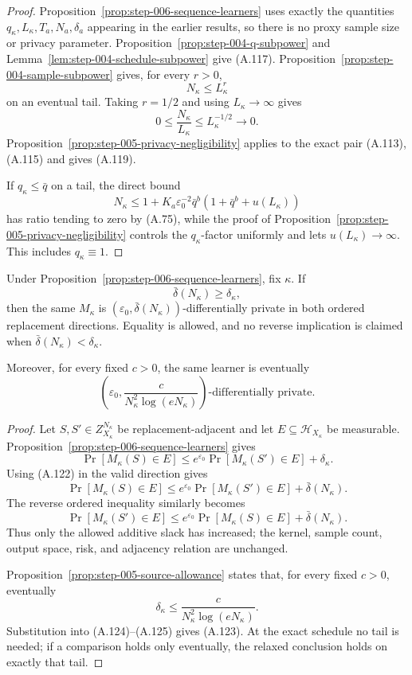 \begin{proof}
Proposition~\ref{prop:step-006-sequence-learners} uses exactly the
quantities \(q_\kappa,L_\kappa,T_a,N_a,\delta_a\) appearing in the
earlier results, so there is no proxy sample size or privacy
parameter.  Proposition~\ref{prop:step-004-q-subpower} and
Lemma~\ref{lem:step-004-schedule-subpower} give (A.117).
Proposition~\ref{prop:step-004-sample-subpower} gives, for every
\(r>0\),
\[
N_\kappa\leq L_\kappa^r
\tag{A.120}
\]
on an eventual tail.  Taking \(r=1/2\) and using
\(L_\kappa\to\infty\) gives
\[
0\leq\frac{N_\kappa}{L_\kappa}
\leq L_\kappa^{-1/2}
\longrightarrow0.
\tag{A.121}
\]
Proposition~\ref{prop:step-005-privacy-negligibility} applies to the
exact pair (A.113), (A.115) and gives (A.119).

If \(q_\kappa\leq\bar q\) on a tail, the direct bound
\[
N_\kappa
\leq
1+K_a\varepsilon_0^{-2}\bar q^b
(1+\bar q^b+u(L_\kappa))
\]
has ratio tending to zero by (A.75), while the proof of
Proposition~\ref{prop:step-005-privacy-negligibility} controls the
\(q_\kappa\)-factor uniformly and lets \(u(L_\kappa)\to\infty\).
This includes \(q_\kappa\equiv1\).
\end{proof}

\begin{lemma}
\label{lem:step-006-privacy-relaxation}
Under Proposition~\ref{prop:step-006-sequence-learners}, fix
\(\kappa\).  If
\[
\bar\delta(N_\kappa)\geq\delta_\kappa,
\tag{A.122}
\]
then the same \(M_\kappa\) is
\((\varepsilon_0,\bar\delta(N_\kappa))\)-differentially private in
both ordered replacement directions.  Equality is allowed, and no
reverse implication is claimed when
\(\bar\delta(N_\kappa)<\delta_\kappa\).

Moreover, for every fixed \(c>0\), the same learner is eventually
\[
\left(
\varepsilon_0,
\frac{c}{N_\kappa^2\log(eN_\kappa)}
\right)\text{-differentially private}.
\tag{A.123}
\]
\end{lemma}

\begin{proof}
Let \(S,S'\in Z_{X_\kappa}^{N_\kappa}\) be replacement-adjacent and
let \(E\subseteq\mathcal H_{X_\kappa}\) be measurable.
Proposition~\ref{prop:step-006-sequence-learners} gives
\[
\Pr[M_\kappa(S)\in E]
\leq e^{\varepsilon_0}\Pr[M_\kappa(S')\in E]
+\delta_\kappa.
\]
Using (A.122) in the valid direction gives
\[
\Pr[M_\kappa(S)\in E]
\leq e^{\varepsilon_0}\Pr[M_\kappa(S')\in E]
+\bar\delta(N_\kappa).
\tag{A.124}
\]
The reverse ordered inequality similarly becomes
\[
\Pr[M_\kappa(S')\in E]
\leq e^{\varepsilon_0}\Pr[M_\kappa(S)\in E]
+\bar\delta(N_\kappa).
\tag{A.125}
\]
Thus only the allowed additive slack has increased; the kernel,
sample count, output space, risk, and adjacency relation are
unchanged.

Proposition~\ref{prop:step-005-source-allowance} states that, for every
fixed \(c>0\), eventually
\[
\delta_\kappa
\leq\frac{c}{N_\kappa^2\log(eN_\kappa)}.
\]
Substitution into (A.124)--(A.125) gives (A.123).  At the exact
schedule no tail is needed; if a comparison holds only eventually,
the relaxed conclusion holds on exactly that tail.
\end{proof}

